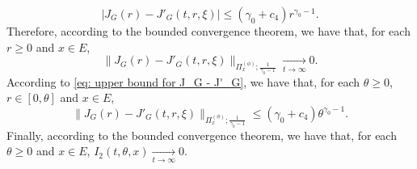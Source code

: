 \documentclass[12pt, a4paper]{amsart}
\theoremstyle{definition}
\numberwithin{equation}{section}
\begin{document}
\begin{equation} \label{eq: upper bound for J_G - J'_G}
	\big| J_G(r) - J'_G(t,r,\xi)\big|
	\leq (\gamma_0 + c_4) r^{\gamma_0 - 1}.
\end{equation}
	Therefore, according to the bounded convergence theorem, we have that, for each $r\geq 0$ and $x\in E$,
\begin{equation}
	 \big\|  J_G(r) - J'_G(t,r,\xi)  \big\|_{\Pi_x^{(\phi)};\frac{1}{\gamma_0 - 1}}
	 \xrightarrow[t\to \infty]{} 0.
\end{equation}
	According to \eqref{eq: upper bound for J_G - J'_G}, we have that, for each $\theta \geq 0$, $r\in [0,\theta]$ and $x\in E$,
\begin{equation}
	\big\|  J_G(r) - J'_G(t,r,\xi)  \big\|_{\Pi_x^{(\phi)};\frac{1}{\gamma_0 - 1}}
	\leq (\gamma_0 + c_4) \theta^{\gamma_0 - 1}.
\end{equation}
	Finally, according to the bounded convergence theorem, we have that, for each $\theta\geq 0$ and $x\in E$, $I_2(t,\theta,x)\xrightarrow[t\to \infty]{} 0$.
	
\end{document}
